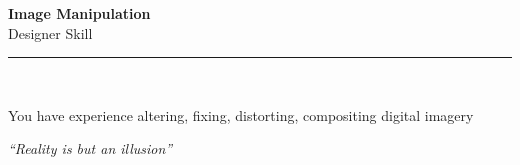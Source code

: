 \documentclass[11pt,a4paper]{memoir}
\begin{document}
    \begin{Spacing}{0.75}%
        \noindent
        \Large
        \textbf{Image Manipulation}\\[3pt]
        \scriptsize\color{gray}Designer Skill\\ 
        \rule{\textwidth}{.3mm}\\
        
        \vspace{3mm}
        \noindent
        \begin{minipage}[t]{53mm}
            \begin{flushleft}
            {
                \normalsize
                \begin{Spacing}{1}%
                \color{black}\textrm{You have experience altering, fixing, distorting, compositing digital imagery}\\
                \end{Spacing}
            }
            \end{flushleft}
        \end{minipage}

        \vspace{5mm}
        \noindent
        \begin{minipage}[t]{53mm}
            \begin{flushleft}
            {
                \normalsize
                \begin{Spacing}{1}%
                \color{gray}\textit{``Reality is but an illusion''}\\
                \end{Spacing}
            }
            \end{flushleft}
        \end{minipage}
    \end{Spacing}
    \clearpage
\end{document}
